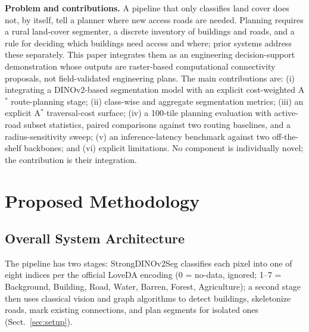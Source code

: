 \documentclass[runningheads]{llncs}
\begin{document}
\textbf{Problem and contributions.} A pipeline that only classifies land cover does not, by itself, tell a planner where new access roads are needed. Planning requires a rural land-cover segmenter, a discrete inventory of buildings and roads, and a rule for deciding which buildings need access and where; prior systems address these separately. This paper integrates them as an engineering decision-support demonstration whose outputs are raster-based computational connectivity proposals, not field-validated engineering plans. The main contributions are: (i) integrating a DINOv2-based segmentation model with an explicit cost-weighted A$^{*}$ route-planning stage; (ii) class-wise and aggregate segmentation metrics; (iii) an explicit A$^{*}$ traversal-cost surface; (iv) a 100-tile planning evaluation with active-road subset statistics, paired comparisons against two routing baselines, and a radius-sensitivity sweep; (v) an inference-latency benchmark against two off-the-shelf backbones; and (vi) explicit limitations. No component is individually novel; the contribution is their integration.

\section{Proposed Methodology}
\subsection{Overall System Architecture}
The pipeline has two stages: StrongDINOv2Seg classifies each pixel into one of eight indices per the official LoveDA encoding (0 = no-data, ignored; 1--7 = Background, Building, Road, Water, Barren, Forest, Agriculture); a second stage then uses classical vision and graph algorithms to detect buildings, skeletonize roads, mark existing connections, and plan segments for isolated ones (Sect.~\ref{sec:setup}).
\end{document}
